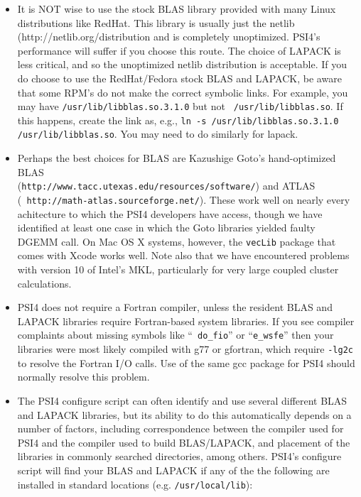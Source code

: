 \documentclass[12pt]{article}
\begin{document}
\begin{itemize}
\item It is NOT wise to use the stock BLAS library provided with many
  Linux distributions like RedHat.  This library is usually just the
  netlib ({http://netlib.org/}distribution and is completely
  unoptimized.  PSI4's performance will suffer if you choose this
  route.  The choice of LAPACK is less critical, and so the
  unoptimized netlib distribution is acceptable.  If you do choose to
  use the RedHat/Fedora stock BLAS and LAPACK, be aware that some
  RPM's do not make the correct symbolic links.  For example, you may
  have {\tt /usr/lib/libblas.so.3.1.0} but not {\tt
    /usr/lib/libblas.so}.  If this happens, create the link as, e.g.,
  {\tt ln -s /usr/lib/libblas.so.3.1.0 /usr/lib/libblas.so}.  You may
  need to do similarly for lapack.

\item Perhaps the best choices for BLAS are Kazushige Goto's
  hand-optimized BLAS \\
({\tt http://www.tacc.utexas.edu/resources/software/}) and ATLAS \\ ({\tt
http://math-atlas.sourceforge.net/}).  These work well on nearly
  every achitecture to which the PSI4 developers have access, though we have
  identified at least one case in which the Goto libraries yielded faulty
  DGEMM call.  On Mac OS X systems, however, the {\tt vecLib} package that
  comes with Xcode works well. Note also that we have encountered problems
  with version 10 of Intel's MKL, particularly for very large coupled
  cluster calculations.

\item PSI4 does not require a Fortran compiler, unless the resident
  BLAS and LAPACK libraries require Fortran-based system libraries.
  If you see compiler complaints about missing symbols like ``{\tt
    do\_fio}'' or ``{\tt e\_wsfe}'' then your libraries were most likely
  compiled with g77 or gfortran, which require {\tt -lg2c} to resolve
  the Fortran I/O calls.  Use of the same gcc package for PSI4 should
  normally resolve this problem.

\item The PSI4 configure script can often identify and use
  several different BLAS and LAPACK libraries, but its ability to do
  this automatically depends on a number of factors, including
  correspondence between the compiler used for PSI4 and the compiler
  used to build BLAS/LAPACK, and placement of the libraries in
  commonly searched directories, among others.  PSI4's configure
  script will find your BLAS and LAPACK if any of the the following
  are installed in standard locations (e.g. {\tt /usr/local/lib}):


\end{itemize}
\end{document}
